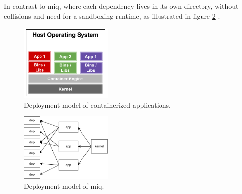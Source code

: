In contrast to miq, where each dependency lives in its own directory, without
collisions and need for a sandboxing runtime, as illustrated in figure
\ref{fig:graph6} .

\begin{figure}
    \centering
    \includegraphics[width=0.4\textwidth]{Screenshot 2023-05-29 173501.png}
    \caption{Deployment model of containerized applications.}
    \label{fig:graph5}
\end{figure}

\begin{figure}
    \centering
    \includegraphics[width=0.4\textwidth]{dep2.png}
    \caption{Deployment model of miq.}
    \label{fig:graph6}
\end{figure}


